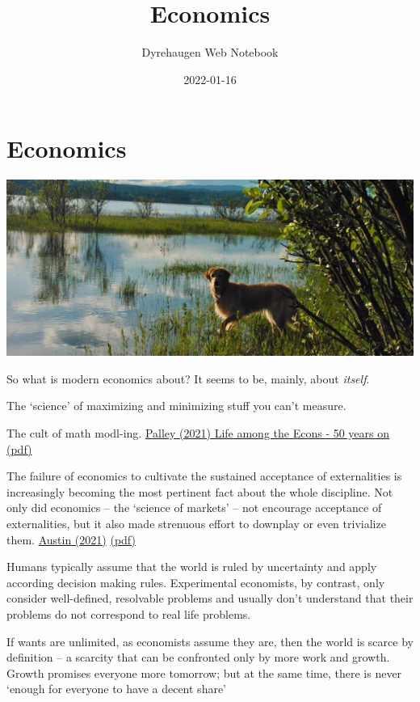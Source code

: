 \documentclass[
]{book}
\title{Economics}
\author{Dyrehaugen Web Notebook}
\date{2022-01-16}
\begin{document}
\maketitle

{
\setcounter{tocdepth}{1}
\tableofcontents
}
\hypertarget{economics}{%
\chapter{Economics}\label{economics}}

\includegraphics{fig/zelda.jpg}

So what is modern economics about? It seems to be, mainly, about \emph{itself}.

The `science' of maximizing and minimizing stuff you can't measure.

The cult of math modl-ing.
\href{pdf/Thomas_Palley_2106_Life_among_the_Econ_50yrs.pdf}{Palley (2021) Life among the Econs - 50 years on (pdf)}

The failure of economics to cultivate the sustained acceptance of externalities is increasingly
becoming the most pertinent fact about the whole discipline. Not only did economics -- the `science
of markets' -- not encourage acceptance of externalities, but it also made strenuous effort to
downplay or even trivialize them.
\href{https://bothbrainsrequire\%20d.com/2021/10/25/fix-that-fails/}{Austin (2021)}
\href{pdf/Austin_2021_Market_Led_Sustainability_Fix_Fails.pdf}{(pdf)}

Humans typically assume that the world is ruled by uncertainty and apply according decision making rules. Experimental economists, by contrast, only consider well-defined, resolvable problems and usually don't understand that their problems do not correspond to real life problems.

If wants are unlimited, as economists assume they are, then the world is scarce by definition -- a scarcity that can be confronted only by more work and growth. Growth promises everyone more tomorrow; but at the same time, there is never `enough for everyone to have a decent share'
\end{document}

